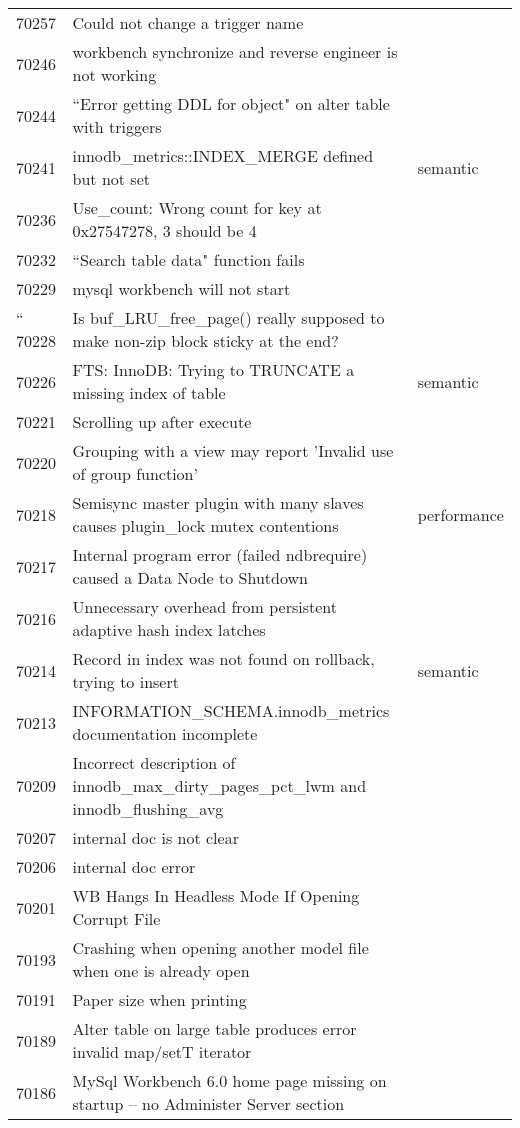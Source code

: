 \begin{longtable}[c]{p{1cm}p{8cm}p{3cm}}
70257 & Could not change a trigger name &  \\
70246 & workbench synchronize and reverse engineer is not working &  \\
70244 & ``Error getting DDL for object" on alter table with triggers &  \\
70241 & innodb\_metrics::INDEX\_MERGE defined but not set & semantic \\
70236 & Use\_count: Wrong count for key at 0x27547278, 3 should be 4 &  \\
70232 & ``Search table data" function fails &  \\
70229 & mysql workbench will not start &  \\``
70228 & Is buf\_LRU\_free\_page() really supposed to make non-zip block sticky at the end? &  \\
70226 & FTS: InnoDB: Trying to TRUNCATE a missing index of table & semantic \\
70221 & Scrolling up after execute &  \\
70220 & Grouping with a view may report 'Invalid use of group function' &  \\
70218 & Semisync master plugin with many slaves causes plugin\_lock mutex contentions & performance \\
70217 & Internal program error (failed ndbrequire) caused a Data Node to Shutdown &  \\
70216 & Unnecessary overhead from persistent adaptive hash index latches &  \\
70214 & Record in index was not found on rollback, trying to insert & semantic \\
70213 & INFORMATION\_SCHEMA.innodb\_metrics documentation incomplete &  \\
70209 & Incorrect description of innodb\_max\_dirty\_pages\_pct\_lwm and innodb\_flushing\_avg &  \\
70207 & internal doc is not clear &  \\
70206 & internal doc error &  \\
70201 & WB Hangs In Headless Mode If Opening Corrupt File &  \\
70193 & Crashing when opening another model file when one is already open &  \\
70191 & Paper size when printing &  \\
70189 & Alter table on large table produces error invalid map/setT iterator &  \\
70186 & MySql Workbench 6.0 home page missing on startup -- no Administer Server section &  \\

\end{longtable}
